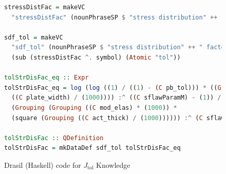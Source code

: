 \documentclass[sigconf]{acmart}
\newcommand{\jtol}{$J_{\mbox{tol}}$}
\begin{document}
\begin{figure}
\begin{lstlisting}[language=Haskell, frame=single, showstringspaces=false] 
stressDistFac = makeVC 
  "stressDistFac" (nounPhraseSP $ "stress distribution" ++ " factor (Function)") cJ

sdf_tol = makeVC 
  "sdf_tol" (nounPhraseSP $ "stress distribution" ++ " factor (Function) based on Pbtol") 
  (sub (stressDistFac ^. symbol) (Atomic "tol"))

tolStrDisFac_eq :: Expr
tolStrDisFac_eq = log (log ((1) / ((1) - (C pb_tol))) * ((Grouping (((C plate_len) / (1000)) * 
  ((C plate_width) / (1000)))) :^ ((C sflawParamM) - (1)) / ((C sflawParamK) * 
  (Grouping (Grouping ((C mod_elas) * (1000)) * 
  (square (Grouping ((C act_thick) / (1000)))))) :^ (C sflawParamM) * (C loadDF))))

tolStrDisFac :: QDefinition
tolStrDisFac = mkDataDef sdf_tol tolStrDisFac_eq
\end{lstlisting}
\caption{Drasil (Haskell) code for \jtol{} Knowledge}
\label{Fig_JtolDrasil}
\end{figure}
\end{document}
